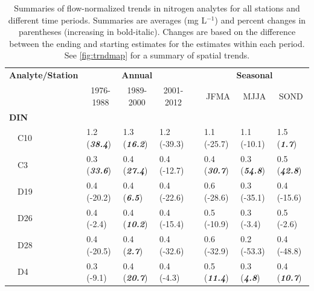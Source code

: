 \documentclass[letterpaper,12pt,oneside]{article}\usepackage[]{graphicx}\usepackage[]{color}
\begin{document}
\begin{table}[!tbp]
\caption{Summaries of flow-normalized trends in nitrogen analytes for all stations and different time periods.  Summaries are averages (mg L$^{-1}$) and percent changes in parentheses (increasing in bold-italic).  Changes are based on the difference between the ending and starting estimates for the estimates within each period.  See \cref{fig:trndmap} for a summary of spatial trends.\label{tab:trnds}} 
\begin{center}
\begin{tabular}{llllclll}
\hline\hline
\multicolumn{1}{l}{\bfseries Analyte/Station}&\multicolumn{3}{c}{\bfseries Annual}&\multicolumn{1}{c}{\bfseries }&\multicolumn{3}{c}{\bfseries Seasonal}\tabularnewline
\cline{2-4} \cline{6-8}
\multicolumn{1}{l}{}&\multicolumn{1}{c}{1976-1988}&\multicolumn{1}{c}{1989-2000}&\multicolumn{1}{c}{2001-2012}&\multicolumn{1}{c}{}&\multicolumn{1}{c}{JFMA}&\multicolumn{1}{c}{MJJA}&\multicolumn{1}{c}{SOND}\tabularnewline
\hline
{\bfseries DIN}&&&&&&&\tabularnewline
~~C10&1.2 \footnotesize{(\textit{\textbf{38.4}})}&1.3 \footnotesize{(\textit{\textbf{16.2}})}&1.2 \footnotesize{(-39.3)}&&1.1 \footnotesize{(-25.7)}&1.1 \footnotesize{(-10.1)}&1.5 \footnotesize{(\textit{\textbf{1.7}})}\tabularnewline
~~C3&0.3 \footnotesize{(\textit{\textbf{33.6}})}&0.4 \footnotesize{(\textit{\textbf{27.4}})}&0.4 \footnotesize{(-12.7)}&&0.4 \footnotesize{(\textit{\textbf{30.7}})}&0.3 \footnotesize{(\textit{\textbf{54.8}})}&0.5 \footnotesize{(\textit{\textbf{42.8}})}\tabularnewline
~~D19&0.4 \footnotesize{(-20.2)}&0.4 \footnotesize{(\textit{\textbf{6.5}})}&0.4 \footnotesize{(-22.6)}&&0.6 \footnotesize{(-28.6)}&0.3 \footnotesize{(-35.1)}&0.4 \footnotesize{(-15.6)}\tabularnewline
~~D26&0.4 \footnotesize{(-2.4)}&0.4 \footnotesize{(\textit{\textbf{10.2}})}&0.4 \footnotesize{(-15.4)}&&0.5 \footnotesize{(-10.9)}&0.3 \footnotesize{(-3.4)}&0.5 \footnotesize{(-2.6)}\tabularnewline
~~D28&0.4 \footnotesize{(-20.5)}&0.4 \footnotesize{(\textit{\textbf{2.7}})}&0.4 \footnotesize{(-32.6)}&&0.6 \footnotesize{(-32.9)}&0.2 \footnotesize{(-53.3)}&0.4 \footnotesize{(-48.8)}\tabularnewline
~~D4&0.3 \footnotesize{(-9.1)}&0.4 \footnotesize{(\textit{\textbf{20.7}})}&0.4 \footnotesize{(-4.3)}&&0.5 \footnotesize{(\textit{\textbf{11.4}})}&0.3 \footnotesize{(\textit{\textbf{4.8}})}&0.4 \footnotesize{(\textit{\textbf{10.7}})}\tabularnewline

\end{tabular}
\end{center}
\end{table}
\end{document}

